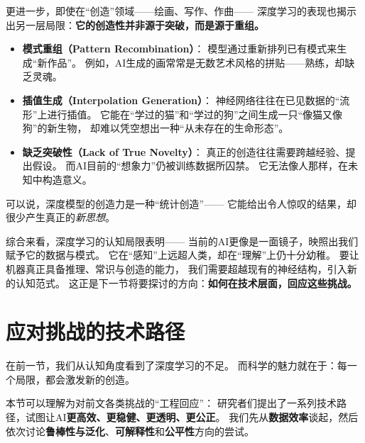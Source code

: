 更进一步，即使在“创造”领域——绘画、写作、作曲——  
深度学习的表现也揭示出另一层局限：\textbf{它的创造性并非源于突破，而是源于重组。}  

\begin{itemize}
\item \textbf{模式重组（Pattern Recombination）}：  
  模型通过重新排列已有模式来生成“新作品”。  
  例如，AI生成的画常常是无数艺术风格的拼贴——熟练，却缺乏灵魂。  

\item \textbf{插值生成（Interpolation Generation）}：  
  神经网络往往在已见数据的“流形”上进行插值。  
  它能在“学过的猫”和“学过的狗”之间生成一只“像猫又像狗”的新生物，  
  却难以凭空想出一种“从未存在的生命形态”。  

\item \textbf{缺乏突破性（Lack of True Novelty）}：  
  真正的创造往往需要跨越经验、提出假设。  
  而AI目前的“想象力”仍被训练数据所囚禁。  
  它无法像人那样，在未知中构造意义。  
\end{itemize}
可以说，深度模型的创造力是一种“统计创造”——  
它能给出令人惊叹的结果，却很少产生真正的\textit{新思想}。

综合来看，深度学习的认知局限表明——  
当前的AI更像是一面镜子，映照出我们赋予它的数据与模式。  
它在“感知”上远超人类，却在“理解”上仍十分幼稚。  
要让机器真正具备推理、常识与创造的能力，  
我们需要超越现有的神经结构，引入新的认知范式。  
这正是下一节将要探讨的方向：\textbf{如何在技术层面，回应这些挑战。}

\section{应对挑战的技术路径}

在前一节，我们从认知角度看到了深度学习的不足。  
而科学的魅力就在于：每一个局限，都会激发新的创造。  

本节可以理解为对前文各类挑战的“工程回应”：  
研究者们提出了一系列技术路径，试图让AI\textbf{更高效、更稳健、更透明、更公正}。  
我们先从\textbf{数据效率}谈起，然后依次讨论\textbf{鲁棒性与泛化}、\textbf{可解释性}和\textbf{公平性}方向的尝试。

%
%

